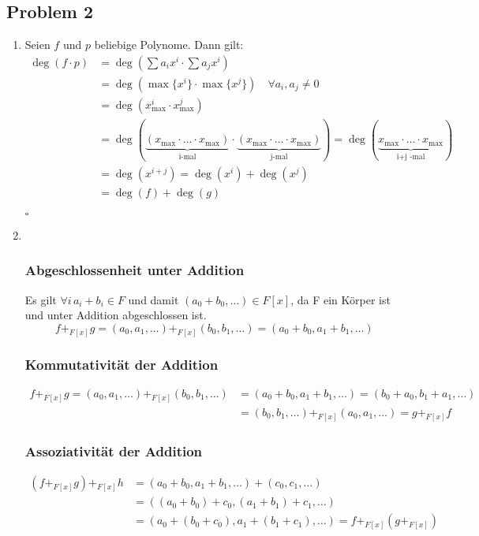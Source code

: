 \documentclass[12pt, german]{article}
\newcommand{\bewiesen}{\begin{flushright}$\square$ \end{flushright} }
\begin{document}
 \subsection*{Problem 2}
    \begin{enumerate}[label=\alph*)]
    	
   
    \item 
    Seien $f$ und $p$ beliebige Polynome. Dann gilt:
    \begin{align*}
    	\deg(f \cdot p) &= \deg(\sum a_ix^i \cdot \sum a_j x^i) \\
    	&= \deg(\max\{x^i\} \cdot \max\{x^j\}) \quad \forall a_i, a_j \neq 0 \\
    	&= \deg(x_{\text{max}}^{i} \cdot x_{\text{max}}^{j})  \\
    	&= \deg(\underbrace{(x_{\text{max}} \cdot \ldots \cdot x_{\text{max}})}_\text{i-mal}\cdot\underbrace{(x_{\text{max}} \cdot \ldots \cdot x_{\text{max}})}_\text{j-mal}) 
    	=\deg(\underbrace{x_{\text{max}}\cdot \ldots \cdot x_{\text{max}}}_\text{i+j -mal})  \\
    	&=\deg(x^{i+j}) = \deg(x^i) + \deg(x^j) \\
    	&= \deg(f) + \deg(g)
    \end{align*}
    \bewiesen
   \newpage
   \item ~\par
  
  	\subsubsection*{Abgeschlossenheit unter Addition}
     Es gilt $\forall i \, a_i+b_i \in F $ und damit $(a_0+b_0,\ldots) \in F[x]$, da  F ein Körper ist und unter Addition abgeschlossen ist.
    $$f +_{F[x]} g = (a_0, a_1,\ldots) +_{F[x]} (b_0, b_1,\ldots) = (a_0+b_0, a_1+b_1,\ldots)$$
  
	\subsubsection*{Kommutativität der Addition} 
    \begin{align*} 
    f +_{F[x]} g = (a_0,a_1,\ldots) +_{F[x]} (b_0,b_1,\ldots)  &= (a_0+b_0,a_1+b_1,\ldots) = (b_0+a_0,b_1+a_1,\ldots) \\
    &= (b_0,b_1,\ldots) +_{F[x]} (a_0,a_1,\ldots) = g +_{F[x]} f
    \end{align*}
    
    \subsubsection*{Assoziativität der Addition}
    \begin{align*}
    (f +_{F[x]} g)+_{F[x]} h &=(a_0+b_0,a_1+b_1,\ldots)+(c_0,c_1,\ldots) \\
    &=((a_0+b_0)+c_0,(a_1+b_1)+c_1,\ldots) \\
    &=(a_0+(b_0+c_0),a_1+(b_1+c_1),\ldots)=f +_{F[x]}(g +_{F[x]})
    \end{align*}
    

\end{enumerate}
\end{document}
